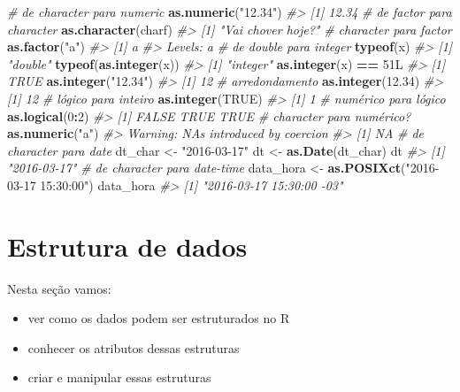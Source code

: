\documentclass[]{book}
\newenvironment{Shaded}{\begin{snugshade}}{\end{snugshade}}
\newcommand{\KeywordTok}[1]{\textcolor[rgb]{0.13,0.29,0.53}{\textbf{#1}}}
\newcommand{\DecValTok}[1]{\textcolor[rgb]{0.00,0.00,0.81}{#1}}
\newcommand{\FloatTok}[1]{\textcolor[rgb]{0.00,0.00,0.81}{#1}}
\newcommand{\StringTok}[1]{\textcolor[rgb]{0.31,0.60,0.02}{#1}}
\newcommand{\CommentTok}[1]{\textcolor[rgb]{0.56,0.35,0.01}{\textit{#1}}}
\newcommand{\OtherTok}[1]{\textcolor[rgb]{0.56,0.35,0.01}{#1}}
\newcommand{\OperatorTok}[1]{\textcolor[rgb]{0.81,0.36,0.00}{\textbf{#1}}}
\newcommand{\NormalTok}[1]{#1}
\providecommand{\tightlist}{%
  \setlength{\itemsep}{0pt}\setlength{\parskip}{0pt}}
\begin{document}
\begin{Shaded}
\begin{Highlighting}[]
\CommentTok{# de character para numeric}
\KeywordTok{as.numeric}\NormalTok{(}\StringTok{"12.34"}\NormalTok{) }
\CommentTok{#> [1] 12.34}
\CommentTok{# de factor para character}
\KeywordTok{as.character}\NormalTok{(charf)}
\CommentTok{#> [1] "Vai chover hoje?"}
\CommentTok{# character para factor}
\KeywordTok{as.factor}\NormalTok{(}\StringTok{"a"}\NormalTok{)}
\CommentTok{#> [1] a}
\CommentTok{#> Levels: a}
\CommentTok{# de double para integer}
\KeywordTok{typeof}\NormalTok{(x)}
\CommentTok{#> [1] "double"}
\KeywordTok{typeof}\NormalTok{(}\KeywordTok{as.integer}\NormalTok{(x))}
\CommentTok{#> [1] "integer"}
\KeywordTok{as.integer}\NormalTok{(x) }\OperatorTok{==}\StringTok{ }\NormalTok{51L}
\CommentTok{#> [1] TRUE}
\KeywordTok{as.integer}\NormalTok{(}\StringTok{"12.34"}\NormalTok{)}
\CommentTok{#> [1] 12}
\CommentTok{# arredondamento}
\KeywordTok{as.integer}\NormalTok{(}\FloatTok{12.34}\NormalTok{)}
\CommentTok{#> [1] 12}
\CommentTok{# lógico para inteiro}
\KeywordTok{as.integer}\NormalTok{(}\OtherTok{TRUE}\NormalTok{)}
\CommentTok{#> [1] 1}
\CommentTok{# numérico para lógico}
\KeywordTok{as.logical}\NormalTok{(}\DecValTok{0}\OperatorTok{:}\DecValTok{2}\NormalTok{)}
\CommentTok{#> [1] FALSE  TRUE  TRUE}
\CommentTok{# character para numérico?}
\KeywordTok{as.numeric}\NormalTok{(}\StringTok{"a"}\NormalTok{)}
\CommentTok{#> Warning: NAs introduced by coercion}
\CommentTok{#> [1] NA}
\CommentTok{# de character para date}
\NormalTok{dt_char <-}\StringTok{ "2016-03-17"}
\NormalTok{dt <-}\StringTok{ }\KeywordTok{as.Date}\NormalTok{(dt_char)}
\NormalTok{dt}
\CommentTok{#> [1] "2016-03-17"}
\CommentTok{# de character para date-time}
\NormalTok{data_hora <-}\StringTok{ }\KeywordTok{as.POSIXct}\NormalTok{(}\StringTok{"2016-03-17 15:30:00"}\NormalTok{)}
\NormalTok{data_hora}
\CommentTok{#> [1] "2016-03-17 15:30:00 -03"}
\end{Highlighting}
\end{Shaded}

\chapter{Estrutura de dados}\label{estrutura-dados}

Nesta seção vamos:

\begin{itemize}
\tightlist
\item
  ver como os dados podem ser estruturados no R
\item
  conhecer os atributos dessas estruturas
\item
  criar e manipular essas estruturas
\end{itemize}
\end{document}
